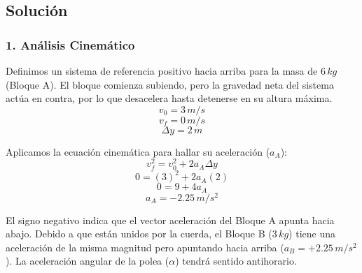 \documentclass[12pt, a4paper]{article}
\begin{document}
\subsection*{Solución}

\subsubsection*{1. Análisis Cinemático}
Definimos un sistema de referencia positivo hacia arriba para la masa de $6 \, \si{kg}$ (Bloque A). El bloque comienza subiendo, pero la gravedad neta del sistema actúa en contra, por lo que desacelera hasta detenerse en su altura máxima.
$$v_0 = 3 \, \si{m/s}$$
$$v_f = 0 \, \si{m/s}$$
$$\Delta y = 2 \, \si{m}$$

Aplicamos la ecuación cinemática para hallar su aceleración ($a_A$):
$$v_f^2 = v_0^2 + 2 a_A \Delta y$$
$$0 = (3)^2 + 2 a_A (2)$$
$$0 = 9 + 4 a_A$$
$$a_A = -2.25 \, \si{m/s^2}$$

El signo negativo indica que el vector aceleración del Bloque A apunta hacia abajo. Debido a que están unidos por la cuerda, el Bloque B ($3 \, \si{kg}$) tiene una aceleración de la misma magnitud pero apuntando hacia arriba ($a_B = +2.25 \, \si{m/s^2}$). La aceleración angular de la polea ($\alpha$) tendrá sentido antihorario.
\end{document}
